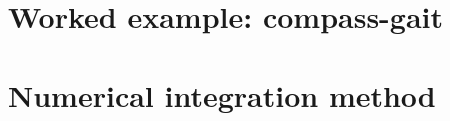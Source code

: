 \chapter{Worked example: compass-gait}
\setcounter{figure}{0}\setcounter{equation}{0}\setcounter{table}{0}

\clearpage

\chapter{Numerical integration method}
\setcounter{figure}{0}\setcounter{equation}{0}\setcounter{table}{0}

\clearpage

